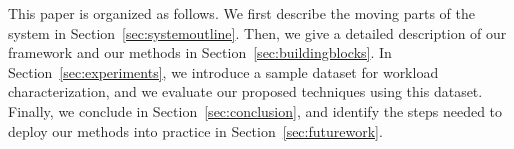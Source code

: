 This paper is organized as follows. We first describe the moving parts of the system in Section~\ref{sec:systemoutline}. 
Then, we give a detailed description of our framework and our methods in Section~\ref{sec:buildingblocks}.
In Section~\ref{sec:experiments}, we introduce a sample dataset for workload characterization, and we evaluate our proposed techniques using this dataset.
Finally, we conclude in Section~\ref{sec:conclusion}, and identify the steps needed to deploy our methods into practice in Section~\ref{sec:futurework}.